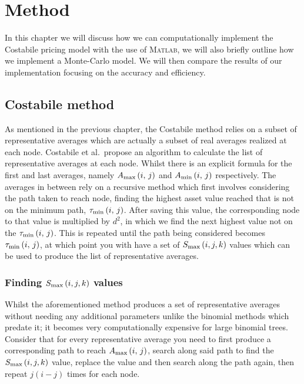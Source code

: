 \chapter{Method}

In this chapter we will discuss how we can computationally implement the Costabile pricing model with the use of \textsc{Matlab}, we will also briefly outline how we implement a Monte-Carlo model. We will then compare the results of our implementation focusing on the accuracy and efficiency.

\section{Costabile method}

As mentioned in the previous chapter, the Costabile method relies on a subset of representative averages which are actually a subset of real averages realized at each node. Costabile et al.~propose an algorithm to calculate the list of representative averages at each node. Whilst there is an explicit formula for the first and last averages, namely \(A_\text{max}\left(i,\,j\right)\) and \(A_\text{min}\left(i,\,j\right)\) respectively. The averages in between rely on a recursive method which first involves considering the path taken to reach node, finding the highest asset value reached that is not on the minimum path, \(\tau_{\text{min}}\left(i,\,j\right)\). After saving this value, the corresponding node to that value is multiplied by \(d^2\), in which we find the next highest value not on the \(\tau_{\text{min}}\left(i,\,j\right)\). This is repeated until the path being considered becomes \(\tau_{\text{min}}\left(i,\,j\right)\), at which point you with have a set of \(S_\text{max}\left({i},{j},{k}\right)\) values which can be used to produce the list of representative averages.

\subsection{Finding \(S_\text{max}\left({i},{j},{k}\right)\) values}

Whilst the aforementioned method produces a set of representative averages without needing any additional parameters unlike the binomial methods which predate it; it becomes very computationally expensive for large binomial trees. Consider that for every representative average you need to first produce a corresponding path to reach \(A_\text{max}\left(i,\,j\right)\), search along said path to find the \(S_\text{max}\left({i},{j},{k}\right)\) value, replace the value and then search along the path again, then repeat \(j(i-j)\) times for each node.

